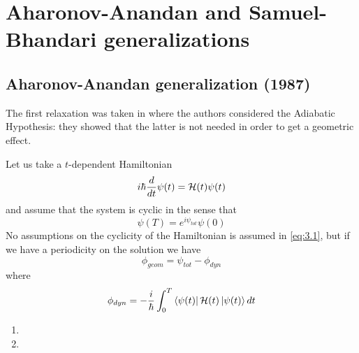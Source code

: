 \chapter{Aharonov-Anandan and Samuel-Bhandari generalizations}
\section{Aharonov-Anandan generalization (1987)}
The first relaxation was taken in \cite{aharonov1987phase} where the authors considered the Adiabatic Hypothesis: they showed that the latter is not needed in order to get a geometric effect. 

Let us take a $ t $-dependent Hamiltonian
\begin{equation}
i\hbar\frac{d}{dt}\psi(t)=\mathcal{H}(t)\psi(t)
\end{equation}
and assume that the system is cyclic in the sense that 
\begin{equation}
\psi(T)=e^{i\psi_{tot}}\psi(0)
\label{eq:3.1}
\end{equation}
No assumptions on the cyclicity of the Hamiltonian is assumed in \eqref{eq:3.1}, but if we have a periodicity on the solution we have 
\begin{equation}
\phi_{geom}=\psi_{tot}-\phi_{dyn}
\end{equation}
where
\begin{equation}
\phi_{dyn}=-\dfrac{i}{\hbar}\int_{0}^{T}\Bra{\psi(t)}\mathcal{H}(t)\Ket{\psi(t)}\mathop{}\!d t
\end{equation}

\begin{enumerate}
	\item
	\item 
\end{enumerate}

